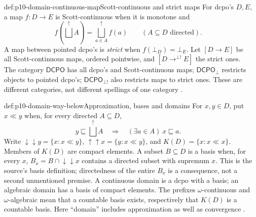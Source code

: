 \begin{hbdefinition}{def:p10-domain-continuous-map}{Scott-continuous and strict maps}
For dcpo's \(D,E\), a map \(f:D\to E\) is Scott-continuous when it is
monotone and
\[
 f(\bigsqcup^{\uparrow} A)=\bigsqcup^{\uparrow}_{a\in A}f(a)
                    \qquad(A\subseteq D\text{ directed}).
\]
A map between pointed dcpo's is \emph{strict} when
\(f(\bot_D)=\bot_E\). Let \([D\longrightarrow E]\) be all
Scott-continuous maps, ordered pointwise, and
\([D\mathrel{\mathop{\longrightarrow}^{\bot!}}E]\) the strict ones.
The category \(\mathsf{DCPO}\) has all dcpo's and Scott-continuous maps;
\(\mathsf{DCPO}_{\bot}\) restricts objects to pointed dcpo's;
\(\mathsf{DCPO}_{\bot!}\) also restricts maps to strict ones.
These are different categories, not different spellings of one category
\cite[Definition~2.1.17; pp.~15,41]{AbramskyJungCorrectedExpandedDomainTheory}.
\end{hbdefinition}

\begin{hbdefinition}{def:p10-domain-way-below}{Approximation, bases and domains}
For \(x,y\in D\), put \(x\ll y\) when, for every directed
\(A\subseteq D\),
\[
 y\sqsubseteq\bigsqcup^{\uparrow}A
       \quad\Longrightarrow\quad
       (\exists a\in A)\ x\sqsubseteq a.
\]
Write \(\mathord{\downarrow\!\downarrow}y=\{x:x\ll y\}\),
\(\mathord{\uparrow\!\uparrow}x=\{y:x\ll y\}\), and
\(K(D)=\{x:x\ll x\}\). Members of \(K(D)\) are compact elements.
A subset \(B\subseteq D\) is a basis when, for every \(x\),
\(B_x=B\cap\mathord{\downarrow\!\downarrow}x\) contains a directed
subset with supremum \(x\). This is the source's basis definition;
directedness of the entire \(B_x\) is a consequence, not a second
unmentioned premise. A continuous domain is a dcpo with a basis; an
algebraic domain has a basis of compact elements. The prefixes
\(\omega\)-continuous and \(\omega\)-algebraic mean that a countable
basis exists, respectively that \(K(D)\) is a countable basis.
Here ``domain'' includes approximation as well as convergence
\cite[Definitions~2.2.1,2.2.3,2.2.6, pp.~18--19]
{AbramskyJungCorrectedExpandedDomainTheory}.
\end{hbdefinition}

